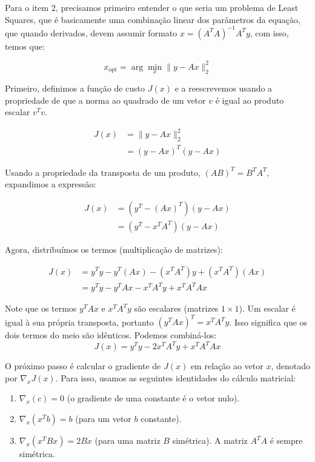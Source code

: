 	Para o item 2, precisamos primeiro entender o que seria um problema de Least Squares, que é basicamente uma combinação linear dos parâmetros da equação, que quando derivados, devem assumir formato $x = (A^T A)^{-1} A^T y$, com isso, temos que:
	
	$$
	x_{\text{opt}} = \arg \min_{x} \| y - Ax \|_2^2
	$$
	
	Primeiro, definimos a função de custo $J(x)$ e a reescrevemos usando a propriedade de que a norma ao quadrado de um vetor $v$ é igual ao produto escalar $v^T v$.
	
	\begin{align*}
		J(x) &= \| y - Ax \|_2^2 \\
		&= (y - Ax)^T (y - Ax)
	\end{align*}
	
	Usando a propriedade da transposta de um produto, $(AB)^T = B^T A^T$, expandimos a expressão:
	
	\begin{align*}
		J(x) &= (y^T - (Ax)^T) (y - Ax) \\
		&= (y^T - x^T A^T) (y - Ax)
	\end{align*}
	
	Agora, distribuímos os termos (multiplicação de matrizes):
	
	\begin{align*}
		J(x) &= y^T y - y^T(Ax) - (x^T A^T)y + (x^T A^T)(Ax) \\
		&= y^T y - y^T Ax - x^T A^T y + x^T A^T Ax
	\end{align*}
	
	Note que os termos $y^T Ax$ e $x^T A^T y$ são escalares (matrizes $1 \times 1$). Um escalar é igual à sua própria transposta, portanto $(y^T Ax)^T = x^T A^T y$. Isso significa que os dois termos do meio são idênticos. Podemos combiná-los:
	$$
	J(x) = y^T y - 2x^T A^T y + x^T A^T Ax
	$$
	
	O próximo passo é calcular o gradiente de $J(x)$ em relação ao vetor $x$, denotado por $\nabla_x J(x)$. Para isso, usamos as seguintes identidades do cálculo matricial:
	\begin{enumerate}
		\item $\nabla_x (c) = 0$ (o gradiente de uma constante é o vetor nulo).
		\item $\nabla_x (x^T b) = b$ (para um vetor $b$ constante).
		\item $\nabla_x (x^T B x) = 2Bx$ (para uma matriz $B$ simétrica). A matriz $A^T A$ é sempre simétrica.
	\end{enumerate}
	
